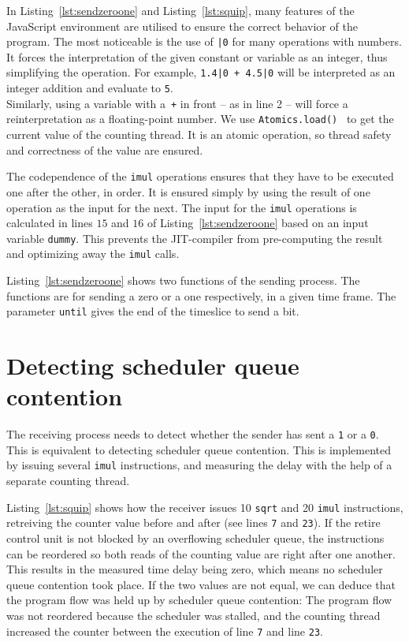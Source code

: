\documentclass[11pt,
  titlepage=false,
  parskip=half,      %
]{scrreprt}
\begin{document}
In Listing~\ref{lst:sendzeroone} and Listing~\ref{lst:squip}, many features of the JavaScript environment are utilised to ensure the correct behavior of the program.
The most noticeable is the use of \texttt{|0} for many operations with numbers.
It forces the interpretation of the given constant or variable as an integer, thus simplifying the operation.
For example, \texttt{1.4|0 + 4.5|0} will be interpreted as an integer addition and evaluate to \texttt{5}. \\
Similarly, using a variable with a~\texttt{+} in front -- as in line 2 -- will force a reinterpretation as a floating-point number.
We use \texttt{Atomics.load()}~\cite{atomicsload} to get the current value of the counting thread.
It is an atomic operation, so thread safety and correctness of the value are ensured.

The codependence of the \texttt{imul} operations ensures that they have to be executed one after the other, in order.
It is ensured simply by using the result of one operation as the input for the next.
The input for the \texttt{imul} operations is calculated in lines $15$ and $16$ of Listing~\ref{lst:sendzeroone} based on an input variable \texttt{dummy}.
This prevents the JIT-compiler from pre-computing the result and optimizing away the \texttt{imul} calls.


Listing~\ref{lst:sendzeroone} shows two functions of the sending process.
The functions are for sending a zero or a one respectively, in a given time frame.
The parameter \texttt{until} gives the end of the timeslice to send a bit.

\section{Detecting scheduler queue contention}
\label{sec:detect-sqc}
The receiving process needs to detect whether the sender has sent a \texttt{1} or a \texttt{0}.
This is equivalent to detecting scheduler queue contention.
This is implemented by issuing several \texttt{imul} instructions,
and measuring the delay with the help of a separate counting thread.

Listing~\ref{lst:squip} shows how the receiver issues 10 \texttt{sqrt} and 20 \texttt{imul} instructions,
retreiving the counter value before and after (see lines \texttt{7} and \texttt{23}).
If the retire control unit is not blocked by an overflowing scheduler queue,
the instructions can be reordered so both reads of the counting value are right after one another.
This results in the measured time delay being zero, which means no scheduler queue contention took place.
If the two values are not equal, we can deduce that the program flow was held up by scheduler queue contention:
The program flow was not reordered because the scheduler was stalled, and the counting thread increased the counter
between the execution of line \texttt{7} and line \texttt{23}.
\end{document}
